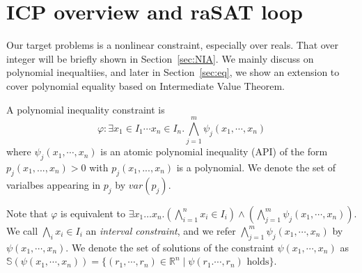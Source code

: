 \documentclass[runningheads,a4paper,oribibl]{llncs}
\newcommand{\Real}{{\mathbb R}}
\begin{document}
\medskip 


\section{ICP overview and \textbf{raSAT} loop}
\label{sec:raSATloop} 

\sloppy

Our target problems is a nonlinear constraint, especially over reals. 
That over integer will be briefly shown in Section~\ref{sec:NIA}.
We mainly discuss on polynomial inequaltiies, and later in Section~\ref{sec:eq},
we show an extension to cover polynomial equality based on
Intermediate Value Theorem. 

\begin{definition}
A polynomial inequality constraint is
\[\varphi: \exists x_1 \in I_1 \cdots x_n \in I_n. \bigwedge
\limits_{j=1}^m \psi_j(x_1,\cdots,x_n)\]
where $\psi_j(x_1,\cdots,x_n)$ is an atomic polynomial inequality (API) of
the form $p_j(x_1,...,x_n) > 0$ with $p_j(x_1,...,x_n)$ is a polynomial.
We denote the set of varialbes appearing in $p_j$ by $var(p_j)$. 
\end{definition}

Note that $\varphi$ is equivalent to 
${\exists x_1 \ldots x_n. (\bigwedge \limits_{i=1}^n x_i \in I_i) \wedge
  (\bigwedge \limits_{j=1}^m \psi_j(x_1,\cdots,x_n))}$. 
We call ${\bigwedge \limits_i x_i \in I_i}$ an {\em interval constraint}, and 
we refer $\bigwedge \limits_{j=1}^m \psi_j(x_1,\cdots,x_n)$ by
$\psi(x_1,\cdots,x_n)$.
We denote the set of solutions of the constraint $\psi(x_1,\cdots, x_n)$ as
${\mathbb{S}(\psi(x_1,\cdots, x_n)) = \{(r_1,\cdots, r_n) \in \Real^n \mid
  \psi(r_1. \cdots, r_n) \text{ holds}\}}$.
\end{document}
